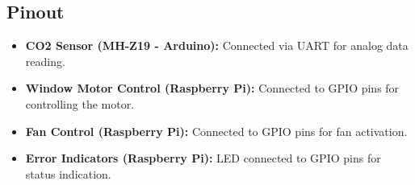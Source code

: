 \subsection{Pinout}
\begin{itemize}
    \item \textbf{CO2 Sensor (MH-Z19 - Arduino):} Connected via UART for analog data reading.
    \item \textbf{Window Motor Control (Raspberry Pi):} Connected to GPIO pins for controlling the motor.
    \item \textbf{Fan Control (Raspberry Pi):} Connected to GPIO pins for fan activation.
    \item \textbf{Error Indicators (Raspberry Pi):} LED connected to GPIO pins for status indication.
\end{itemize}
